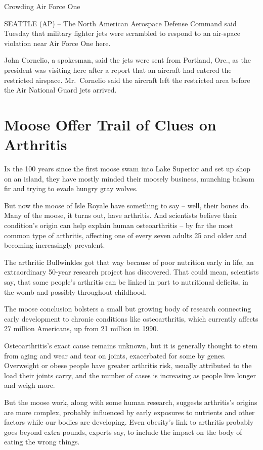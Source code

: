 ﻿\documentclass[12pt]{article}
\begin{document}
Crowding Air Force One

SEATTLE (AP) -- The North American Aerospace Defense Command said Tuesday that military fighter jets
were scrambled to respond to an air-space violation near Air Force One here.

John Cornelio, a spokesman, said the jets were sent from Portland, Ore., as the president was
visiting here after a report that an aircraft had entered the restricted airspace. Mr.~Cornelio said
the aircraft left the restricted area before the Air National Guard jets arrived.

\section{Moose Offer Trail of Clues on Arthritis}

\lettrine{I}{n} the 100 years since the first moose swam into Lake Superior
and set up shop on an island, they have mostly minded their moosely business, munching balsam fir
and trying to evade hungry gray wolves.

But now the moose of Isle Royale have something to say -- well, their bones do. Many of the moose,
it turns out, have arthritis. And scientists believe their condition's origin can help explain human
osteoarthritis -- by far the most common type of arthritis, affecting one of every seven adults 25
and older and becoming increasingly prevalent.

The arthritic Bullwinkles got that way because of poor nutrition early in life, an extraordinary
50-year research project has discovered. That could mean, scientists say, that some people's
arthritis can be linked in part to nutritional deficits, in the womb and possibly throughout
childhood.

The moose conclusion bolsters a small but growing body of research connecting early development to
chronic conditions like osteoarthritis, which currently affects 27 million Americans, up from 21
million in 1990.

Osteoarthritis's exact cause remains unknown, but it is generally thought to stem from aging and
wear and tear on joints, exacerbated for some by genes. Overweight or obese people have greater
arthritis risk, usually attributed to the load their joints carry, and the number of cases is
increasing as people live longer and weigh more.

But the moose work, along with some human research, suggests arthritis's origins are more complex,
probably influenced by early exposures to nutrients and other factors while our bodies are
developing. Even obesity's link to arthritis probably goes beyond extra pounds, experts say, to
include the impact on the body of eating the wrong things.
\end{document}
